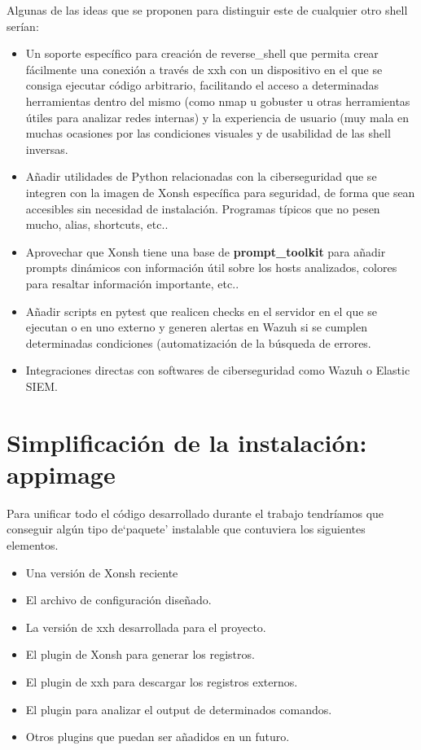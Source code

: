 Algunas de las ideas que se proponen para distinguir este de cualquier otro shell serían:

\begin{itemize}
    \item Un soporte específico para creación de \gls{reverse_shell} que permita crear fácilmente una conexión a través de xxh con un dispositivo en el que se consiga ejecutar código arbitrario, facilitando el acceso a determinadas herramientas dentro del mismo (como nmap u gobuster u otras herramientas útiles para analizar redes internas) y la experiencia de usuario (muy mala en muchas ocasiones por las condiciones visuales y de usabilidad de las shell inversas.
    \item Añadir utilidades de Python relacionadas con la ciberseguridad que se integren con la imagen de Xonsh específica para seguridad, de forma que sean accesibles sin necesidad de instalación. Programas típicos que no pesen mucho, alias, shortcuts, etc..
    \item Aprovechar que Xonsh tiene una base de \textbf{prompt\_toolkit} para añadir prompts dinámicos con información útil sobre los hosts analizados, colores para resaltar información importante, etc..
    \item Añadir scripts en pytest que realicen checks en el servidor en el que se ejecutan o en uno externo y generen alertas en Wazuh si se cumplen determinadas condiciones (automatización de la búsqueda de errores.
    \item Integraciones directas con softwares de ciberseguridad como Wazuh o Elastic SIEM.
\end{itemize}


\section{Simplificación de la instalación: appimage}

Para unificar todo el código desarrollado durante el trabajo tendríamos que conseguir algún tipo de`paquete' instalable que contuviera los siguientes elementos.

\begin{itemize}
    \item Una versión de Xonsh reciente
    \item El archivo de configuración diseñado.
    \item La versión de xxh desarrollada para el proyecto.
    \item El plugin de Xonsh para generar los registros.
    \item El plugin de xxh para descargar los registros externos.
    \item El plugin para analizar el output de determinados comandos.
    \item Otros plugins que puedan ser añadidos en un futuro.
\end{itemize}

